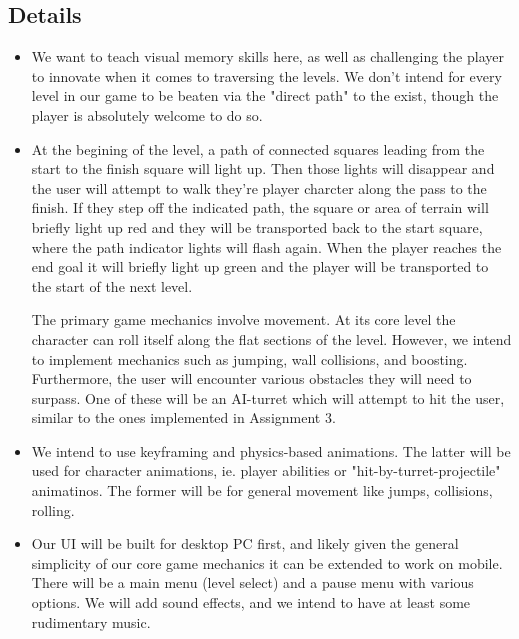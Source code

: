 \documentclass[11pt]{article}
\begin{document}
\subsection{Details}
\begin{itemize}
\item

We want to teach visual memory skills here, as well as challenging the player to innovate when it comes to traversing the levels. We don't intend for every level in our game to be beaten via the "direct path" to the exist, though the player is absolutely welcome to do so.

\item 

At the begining of the level, a path of connected squares leading from the start to the finish square will light up. Then those lights will disappear and the user will attempt to walk they're player charcter along the pass to the finish.
If they step off the indicated path, the square or area of terrain will briefly light up red and they will be transported back to the start square, where the path indicator lights will flash again. When the player reaches the end goal it will briefly light up green and the player will be transported to the start of the next level.

The primary game mechanics involve movement. At its core level the character can roll itself along the flat sections of the level. 
However, we intend to implement mechanics such as jumping, wall collisions, and boosting. Furthermore, the user will encounter various obstacles they
will need to surpass. One of these will be an AI-turret which will attempt to hit the user, similar to the ones implemented in Assignment 3.

\item 

We intend to use keyframing and physics-based animations. 
The latter will be used for character animations, ie. player abilities or "hit-by-turret-projectile" animatinos. 
The former will be for general movement like jumps, collisions, rolling.

\item 

Our UI will be built for desktop PC first, and likely given the general simplicity of our core game mechanics it can be extended to work on mobile. There will be a main menu (level select) and a pause menu with various options. 
We will add sound effects, and we intend to have at least some rudimentary music.

\end{itemize}
\end{document}
